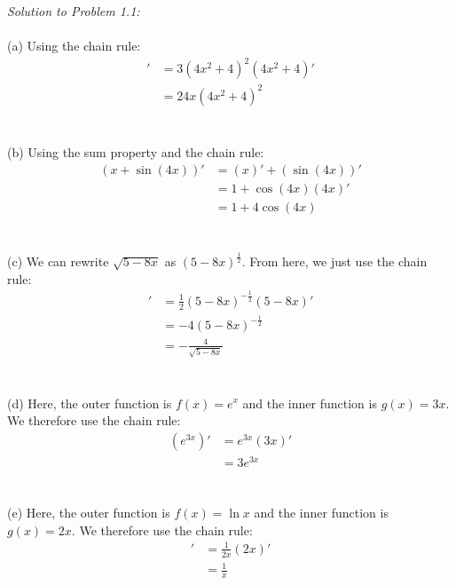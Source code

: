 \documentclass[11pt]{scrartcl}
\begin{document}
\noindent
\textit{Solution to Problem 1.1:}\\
\noindent\\
(a) Using the chain rule:
\begin{align*}
    [(4x^2+4)^3]' & = 3(4x^2+4)^2(4x^2+4)'\\
                  & = 24x(4x^2+4)^2
\end{align*}\\
\noindent\\
(b) Using the sum property and the chain rule:
\begin{align*}
    (x+\sin (4x))' & = (x)'+(\sin (4x))'\\
                 & = 1+\cos (4x)(4x)'\\
                 & = 1+4\cos (4x)
\end{align*}\\
\noindent\\
(c) We can rewrite $\sqrt {5-8x}$ as $(5-8x)^\frac{1}{2}$. From here, we just use the chain rule:
\begin{align*}
    [(5-8x)^\frac{1}{2}]' & = \frac{1}{2}(5-8x)^{-\frac{1}{2}}(5-8x)'\\
                          & = -4(5-8x)^{-\frac{1}{2}}\\
                          & = -\frac{4}{\sqrt {5-8x}}
\end{align*}\\
\noindent \\
(d) Here, the outer function is $f(x)=e^x$ and the inner function is $g(x)=3x$. We therefore use the chain rule: 
\begin{align*}
    (e^{3x})' &=e^{3x}(3x)' \\
              &=3e^{3x}
\end{align*}\\
\\
\noindent 
(e) Here, the outer function is $f(x)=\ln x$ and the inner function is $g(x)=2x$. We therefore use the chain rule: 
\begin{align*}
    [\ln(2x)]' &=\frac{1}{2x}(2x)' \\
               &=\frac{1}{x}
\end{align*}
\end{document}
